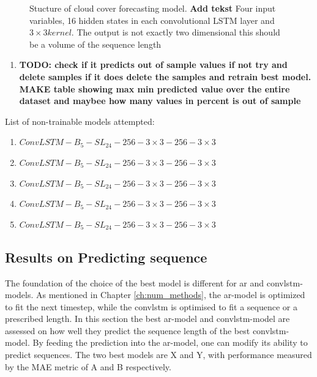 \begin{figure}
    \centering
    
    \caption{Stucture of cloud cover forecasting model. \textbf{Add tekst} Four input variables, 16 hidden states in each convolutional LSTM layer and $3\times 3 kernel$. The output is not exactly two dimensional this should be a volume of the sequence length}
    \label{fig:best_ml_architecture}
\end{figure}

\begin{enumerate}
    \item \textbf{TODO: check if it predicts out of sample values if not try and delete samples if it does delete the samples and retrain best model. MAKE table showing max min predicted value over the entire dataset and maybee how many values in percent is out of sample}
\end{enumerate}

List of non-trainable models attempted:
\begin{enumerate}
    \item $ConvLSTM-B_{5}-SL_{24}-256-3\times3-256-3\times3$
    \item $ConvLSTM-B_{5}-SL_{24}-256-3\times3-256-3\times3$
    \item $ConvLSTM-B_{5}-SL_{24}-256-3\times3-256-3\times3$
    \item $ConvLSTM-B_{5}-SL_{24}-256-3\times3-256-3\times3$
    \item $ConvLSTM-B_{5}-SL_{24}-256-3\times3-256-3\times3$
\end{enumerate}
 
\subsection{Results on Predicting sequence}
The foundation of the choice of the best model is different for \acrshort{ar} and \acrshort{convlstm}-models. As mentioned in Chapter \ref{ch:num_methods}, the \acrshort{ar}-model is optimized to fit the next timestep, while the \acrshort{convlstm} is optimised to fit a sequence or a prescribed length. In this section the best \acrshort{ar}-model and \acrshort{convlstm}-model are assessed on how well they predict the sequence length of the best \acrshort{convlstm}-model. By feeding the prediction into the \acrshort{ar}-model, one can modify its ability to predict sequences. The two best models are X and Y, with performance measured by the MAE metric of A and B respectively. 

